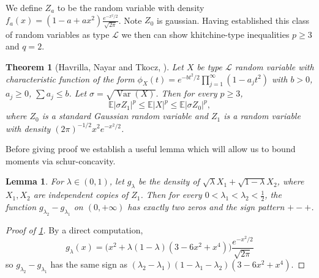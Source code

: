 \documentclass[10pt]{article}
\newcommand{\E}{\mathbb{E}}
\newcommand{\1}{\textbf{1}}
\DeclareMathOperator{\Var}{Var}
\newtheorem{theorem}{Theorem}[subsection]
\newtheorem{lemma}{Lemma}[subsection]
\theoremstyle{remark}
\theoremstyle{definition}
\begin{document}
We define $Z_a$ to be the random variable with density $f_a(x) = (1-a+ax^2)\frac{e^{-x^2/2}}{\sqrt{2\pi}}$. Note $Z_0$ is gaussian. Having established this class of random variables as type $\mathcal{L}$ we then can show khitchine-type inequalities $p \geq 3$ and $q=2$. 

\begin{theorem}[Havrilla, Nayar and Tkocz, \cite{HNT}]\label{thm:L3}
Let $X$ be type $\mathcal{L}$ random variable with characteristic function of the form $\phi_X(t) = e^{-b t^2/2}\prod_{j=1}^\infty(1-a_jt^2)$ with $b > 0$, $a_j \geq 0$, $\sum a_j \leq b$. Let $\sigma = \sqrt{\Var(X)}$. Then for every $p \geq 3$, 
\[
\E|\sigma Z_1|^p \leq \E|X|^p \leq \E|\sigma Z_0|^p,\]
where $Z_0$ is a standard Gaussian random variable and $Z_1$ is a random variable with density $(2\pi)^{-1/2}x^2e^{-x^2/2}$.
\end{theorem}

Before giving proof we establish a useful lemma which will allow us to bound moments via schur-concavity.

\begin{lemma}\label{lm:interlacing}
For $\lambda \in (0,1)$, let $g_\lambda$ be the density of $\sqrt{\lambda}X_1 + \sqrt{1-\lambda}X_2$, where $X_1, X_2$ are independent copies of $Z_1$. Then for every $0 < \lambda_1 < \lambda_2 < \frac{1}{2}$, the function $g_{\lambda_2} - g_{\lambda_1}$ on $(0,+\infty)$ has exactly two zeros and the sign pattern $+-+$.
\end{lemma}
\begin{proof}[Proof of \ref{lm:interlacing}]
By a direct computation, 
\[g_\lambda(x) = \Big(x^2+\lambda(1-\lambda)(3-6x^2+x^4)\Big)\frac{e^{-x^2/2}}{\sqrt{2\pi}}
\]
so $g_{\lambda_2} - g_{\lambda_1}$ has the same sign as $(\lambda_2-\lambda_1)(1-\lambda_1-\lambda_2)(3-6x^2+x^4)$.
\end{proof}
\end{document}
